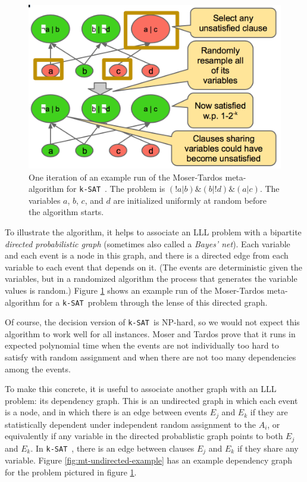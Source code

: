 \documentclass[twocolumn]{article}
\newcommand{\ksat}{\texttt{k-SAT}~}
\begin{document}
\begin{figure}[ht]
  \includegraphics[scale=0.5]{figures/mt-directed-example.png}
  \caption{One iteration of an example run of the Moser-Tardos meta-algorithm for \ksat.  The problem is $(!a|b)\&(b|!d)\&(a|c)$.  The variables $a$, $b$, $c$, and $d$ are initialized uniformly at random before the algorithm starts.}
  \label{fig:mt-directed-example}
\end{figure}

To illustrate the algorithm, it helps to associate an LLL problem with a bipartite \emph{directed probabilistic graph} (sometimes also called a \emph{Bayes' net}).  Each variable and each event is a node in this graph, and there is a directed edge from each variable to each event that depends on it.  (The events are deterministic given the variables, but in a randomized algorithm the process that generates the variable values is random.)  Figure \ref{fig:mt-directed-example} shows an example run of the Moser-Tardos meta-algorithm for a \ksat problem through the lense of this directed graph.

Of course, the decision version of \ksat is NP-hard, so we would not expect this algorithm to work well for all instances.  Moser and Tardos \cite{moser2010constructive} prove that it runs in expected polynomial time when the events are not individually too hard to satisfy with random assignment and when there are not too many dependencies among the events.

To make this concrete, it is useful to associate another graph with an LLL problem: its dependency graph.  This is an undirected graph in which each event is a node, and in which there is an edge between events $E_j$ and $E_k$ if they are statistically dependent under independent random assignment to the $A_i$, or equivalently if any variable in the directed probablistic graph points to both $E_j$ and $E_k$.  In \ksat, there is an edge between clauses $E_j$ and $E_k$ if they share any variable.  Figure \ref{fig:mt-undirected-example} has an example dependency graph for the problem pictured in figure \ref{fig:mt-directed-example}.
\end{document}
